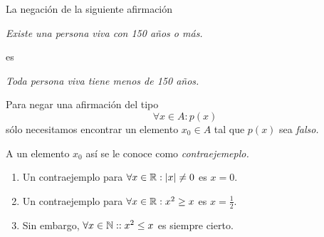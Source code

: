  \begin{problema}
  \label{lip:exmp:4.10.b}
  La negación de la siguiente afirmación
  \begin{center}
   \emph{Existe una persona viva con 150 a\~nos o más.}
  \end{center}
 es 
 \begin{center}
  \emph{Toda persona viva tiene menos de 150 a\~nos.}
 \end{center}

 \end{problema}

 \begin{observacion}
  Para negar una afirmación del tipo $$\forall x \in A: p(x)$$ sólo necesitamos encontrar un elemento $x_{0}\in A$ tal que $p(x)$ sea \emph{falso.}
  
  
  A un elemento $x_{0}$ así se le conoce como \emph{contraejemeplo.}
 \end{observacion}

 \begin{problema}
 \label{lip:4.11}
  \begin{enumerate}
   \item 
  Un contraejemplo para $\forall x \in \mathbb{R}: \left|x\right|\neq 0$ es $x=0.$  
   \item 
  Un contraejemplo para $\forall x \in \mathbb{R}: x^{2}\geq x$ es $x=\frac{1}{2}.$  
   \item 
  Sin embargo, $\forall x \in \mathbb{N}: : x^{2}\leq x$ es siempre cierto.
  \end{enumerate}

 \end{problema}





